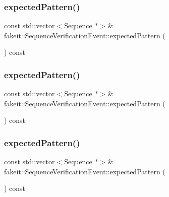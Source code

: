 \subsubsection{\texorpdfstring{expectedPattern()}{expectedPattern()}\hspace{0.1cm}{\footnotesize\ttfamily [7/9]}}
{\footnotesize\ttfamily const std\+::vector$<$\mbox{\hyperlink{classfakeit_1_1Sequence}{Sequence}} $\ast$$>$\& fakeit\+::\+Sequence\+Verification\+Event\+::expected\+Pattern (\begin{DoxyParamCaption}{ }\end{DoxyParamCaption}) const\hspace{0.3cm}{\ttfamily [inline]}}

\mbox{\label{structfakeit_1_1SequenceVerificationEvent_a2d3fb35082acdadfe2be2a4d69c94189}} 
\subsubsection{\texorpdfstring{expectedPattern()}{expectedPattern()}\hspace{0.1cm}{\footnotesize\ttfamily [8/9]}}
{\footnotesize\ttfamily const std\+::vector$<$\mbox{\hyperlink{classfakeit_1_1Sequence}{Sequence}} $\ast$$>$\& fakeit\+::\+Sequence\+Verification\+Event\+::expected\+Pattern (\begin{DoxyParamCaption}{ }\end{DoxyParamCaption}) const\hspace{0.3cm}{\ttfamily [inline]}}

\mbox{\label{structfakeit_1_1SequenceVerificationEvent_a2d3fb35082acdadfe2be2a4d69c94189}} 
\subsubsection{\texorpdfstring{expectedPattern()}{expectedPattern()}\hspace{0.1cm}{\footnotesize\ttfamily [9/9]}}
{\footnotesize\ttfamily const std\+::vector$<$\mbox{\hyperlink{classfakeit_1_1Sequence}{Sequence}} $\ast$$>$\& fakeit\+::\+Sequence\+Verification\+Event\+::expected\+Pattern (\begin{DoxyParamCaption}{ }\end{DoxyParamCaption}) const\hspace{0.3cm}{\ttfamily [inline]}}



